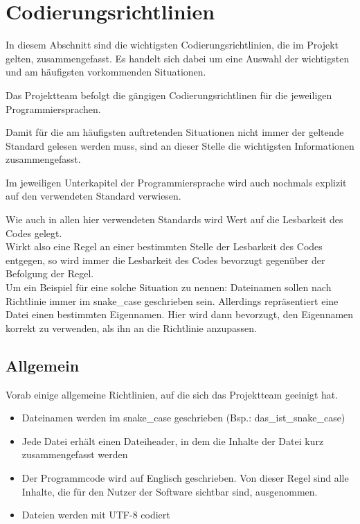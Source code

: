 
\chapter{Codierungsrichtlinien}\label{sec:Chap2}
In diesem Abschnitt sind die wichtigsten Codierungsrichtlinien, die im Projekt gelten, zusammengefasst. Es handelt sich dabei um eine Auswahl der wichtigsten und am häufigsten vorkommenden Situationen.

Das Projektteam befolgt die gängigen Codierungsrichtlinen für die jeweiligen Programmiersprachen. 

Damit für die am häufigsten auftretenden Situationen nicht immer der geltende Standard gelesen werden muss, sind an dieser Stelle die wichtigsten Informationen zusammengefasst. 

Im jeweiligen Unterkapitel der Programmiersprache wird auch nochmals explizit auf den verwendeten Standard verwiesen.

Wie auch in allen hier verwendeten Standards wird Wert auf die Lesbarkeit des Codes gelegt.\\
Wirkt also eine Regel an einer bestimmten Stelle der Lesbarkeit des Codes entgegen, so wird immer die Lesbarkeit des Codes bevorzugt gegenüber der Befolgung der Regel.\\
Um ein Beispiel für eine solche Situation zu nennen:
Dateinamen sollen nach Richtlinie immer im snake\_case geschrieben sein. Allerdings repräsentiert eine Datei einen bestimmten Eigennamen. Hier wird dann bevorzugt, den Eigennamen korrekt zu verwenden, als ihn an die Richtlinie anzupassen.
\section{Allgemein}
Vorab einige allgemeine Richtlinien, auf die sich das Projektteam geeinigt hat.
\begin{itemize}
\item Dateinamen werden im snake\_case geschrieben (Bsp.: das\_ist\_snake\_case)
\item Jede Datei erhält einen Dateiheader, in dem die Inhalte der Datei kurz zusammengefasst werden
\item Der Programmcode wird auf Englisch geschrieben. Von dieser Regel sind alle Inhalte, die für den Nutzer der Software sichtbar sind, ausgenommen.
\item Dateien werden mit UTF-8 codiert
\end{itemize}

